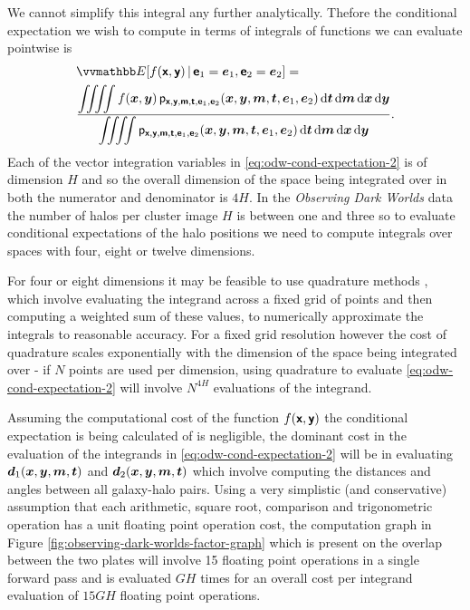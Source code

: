 We cannot simplify this integral any further analytically. Thefore the conditional expectation we wish to compute in terms of integrals of functions we can evaluate pointwise is
\begin{equation}\label{eq:odw-cond-expectation-2}
\begin{split}
  &\expc{f(\rvct{x},\rvct{y}) \gvn \rvct{e}_1 =\vct{e}_1, \rvct{e}_2=\vct{e}_2} = \\
  &
  \frac
  {\displaystyle
    \iiiint f(\vct{x},\vct{y}) \, 
    \pden
      {\rvct{x},\rvct{y},\rvct{m},\rvct{t},\rvct{e}_1,\rvct{e}_2}
      (\vct{x},\vct{y},\vct{m},\vct{t},\vct{e}_1,\vct{e}_2)
    \,\dr\vct{t}\,\dr\vct{m}\,\dr{\vct{x}}\,\dr{\vct{y}}
  }
  {\displaystyle
    \iiiint
      \pden
      {\rvct{x},\rvct{y},\rvct{m},\rvct{t},\rvct{e}_1,\rvct{e}_2}
      (\vct{x},\vct{y},\vct{m},\vct{t},\vct{e}_1,\vct{e}_2)
    \,\dr\vct{t}\,\dr\vct{m}\,\dr{\vct{x}}\,\dr{\vct{y}}
  }.
\end{split}
\end{equation}
Each of the vector integration variables in \eqref{eq:odw-cond-expectation-2} is of dimension $H$ and so the overall dimension of the space being integrated over in both the numerator and denominator is $4H$.
In the \emph{Observing Dark Worlds} data the number of halos per cluster image $H$ is between one and three so to evaluate conditional expectations of the halo positions we need to compute integrals over spaces with four, eight or twelve dimensions. 

For four or eight dimensions it may be feasible to use quadrature methods \citep{davis1967numerical}, which involve evaluating the integrand across a fixed grid of points and then computing a weighted sum of these values, to numerically approximate the integrals to reasonable accuracy. For a fixed grid resolution however the cost of quadrature scales exponentially with the dimension of the space being integrated over - if $N$ points are used per dimension, using quadrature to evaluate \eqref{eq:odw-cond-expectation-2} will involve $N^{4H}$ evaluations of the integrand. 

Assuming the computational cost of the function $f(\boldsymbol{\mathsf{x}},\boldsymbol{\mathsf{y}})$ the conditional expectation is being calculated of is negligible, the dominant cost in the evaluation of the integrands in \eqref{eq:odw-cond-expectation-2} will be in evaluating $\boldsymbol{d}_1(\boldsymbol{x},\boldsymbol{y},\boldsymbol{m},\boldsymbol{t})$ and $\boldsymbol{d}_2(\boldsymbol{x},\boldsymbol{y},\boldsymbol{m},\boldsymbol{t})$ which involve computing the distances and angles between all galaxy-halo pairs. Using a very simplistic (and conservative) assumption that each arithmetic, square root, comparison and trigonometric operation has a unit floating point operation cost, the computation graph in Figure \ref{fig:observing-dark-worlds-factor-graph} which is present on the overlap between the two plates will involve 15 floating point operations in a single forward pass and is evaluated $GH$ times for an overall cost per integrand evaluation of $15GH$ floating point operations. 

